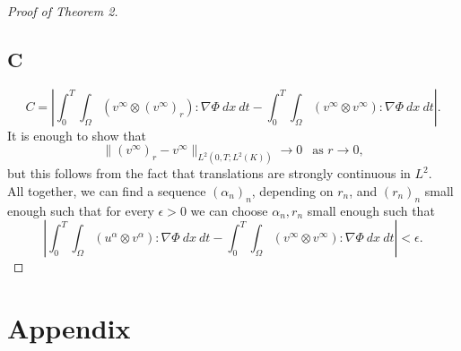 \documentclass{amsart}
\begin{document}
\begin{proof}[Proof of Theorem 2]
\subsection*{C}
$$ C= \left| \int_0^T \int_{\Omega} \left(v^{\infty} \otimes (v^{\infty})_r\right) : \nabla \Phi \ dx \ dt - \int_0^T \int_{\Omega} (v^{\infty} \otimes v^{\infty}) : \nabla \Phi \ dx \ dt \right|.$$
It is enough to show that
$$ \|(v^{\infty})_r-v^{\infty}\|_{L^2(0,T;L^2(K))} \to 0 \ \ \text{ as } r\to 0,$$
but this follows from the fact that translations are strongly continuous in $L^2$.\\

All together, we can find a sequence $(\alpha_n)_n$, depending on $r_n$, and $(r_n)_n$ small enough such that for every $\epsilon>0$ we can choose $\alpha_n, r_n$ small enough such that
$$ \left| \int_0^T \int_{\Omega} (u^{\alpha} \otimes v^{\alpha}) : \nabla \Phi \ dx \ dt - \int_0^T \int_{\Omega} (v^{\infty} \otimes v^{\infty}) : \nabla \Phi \ dx \ dt \right| < \epsilon.$$


\end{proof}




\section*{Appendix}
\end{document}
